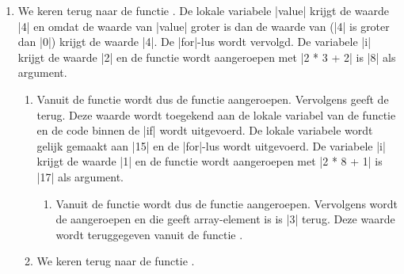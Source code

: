 \begin{cpplstShortInline}
\begin{enumerate}[leftmargin=1.4em]
\begin{enumerate}[label*=\arabic*.,leftmargin=1.4em]
\begin{enumerate}[label*=\arabic*.,leftmargin=1.4em]
\begin{enumerate}[label*=\arabic*.,leftmargin=1.4em]
			\end{enumerate}
			\item We keren terug naar de functie .
			De lokale variabele |value| krijgt de waarde |4| en omdat de waarde van |value| groter is dan de waarde van  (|4| is groter dan |0|) krijgt  de waarde |4|.
			De |for|-lus wordt vervolgd.
			De variabele |i| krijgt de waarde |2| en de functie  wordt aangeroepen met |2 * 3 + 2| is |8| als argument.
			\begin{enumerate}[label*=\arabic*.,leftmargin=1.4em]
				\item Vanuit de functie  wordt dus de functie  aangeroepen.
				Vervolgens geeft de   terug.
				Deze waarde wordt toegekend aan de lokale variabel  van de functie  en de code binnen de |if| wordt uitgevoerd.
				De lokale variabele  wordt gelijk gemaakt aan |15| en de |for|-lus wordt uitgevoerd.
				De variabele |i| krijgt de waarde |1| en de functie  wordt aangeroepen met |2 * 8 + 1| is |17| als argument.
				\begin{enumerate}[label*=\arabic*.,leftmargin=1.4em]
					\item Vanuit de functie  wordt dus de functie  aangeroepen.
					Vervolgens wordt de  aangeroepen en die geeft array-element  is  is |3| terug.
					Deze waarde wordt teruggegeven vanuit de functie .
				\end{enumerate}
				\item We keren terug naar de functie .

\end{enumerate}
\end{enumerate}
\end{enumerate}
\end{enumerate}
\end{cpplstShortInline}
